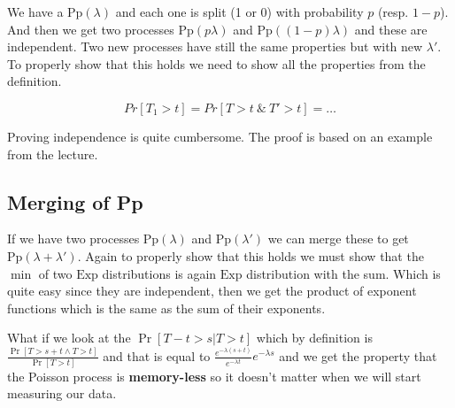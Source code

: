 We have a $\text{Pp}(\lambda)$ and each one is split (1 or 0) with probability $p$ (resp. $1-p$). And then we get two processes $\text{Pp}(p \lambda)$ and $\text{Pp}((1-p) \lambda)$ and these are independent. Two new processes have still the same properties but with new $\lambda'$. To properly show that this holds we need to show all the properties from the definition.


$$
Pr[T_1 > t] = Pr[T>t \ \&  \ T' > t] =  \dots
$$

\begin{rem}
	Proving independence is quite cumbersome. The proof is based on an example from the lecture.
\end{rem}

\subsection{Merging of Pp}

If we have two processes $\text{Pp}(\lambda)$ and $\text{Pp}(\lambda')$ we can merge these to get $\text{Pp}(\lambda + \lambda')$. Again to properly show that this holds we must show that the $\min$ of two $\text{Exp}$ distributions is again $\text{Exp}$ distribution with the sum. Which is quite easy since they are independent, then we get the product of exponent functions which is the same as the sum of their exponents.

What if we look at the $\Pr[T - t > s \vert T > t]$ which by definition is $\frac{\Pr[T > s+t \land T > t]}{\Pr [T > t]}$ and that is equal to $\frac{e^{-\lambda (s+t)}}{e^{-\lambda t}} e^{-\lambda s}$ and we get the property that the Poisson process is \textbf{memory-less} so it doesn't matter when we will start measuring our data.
